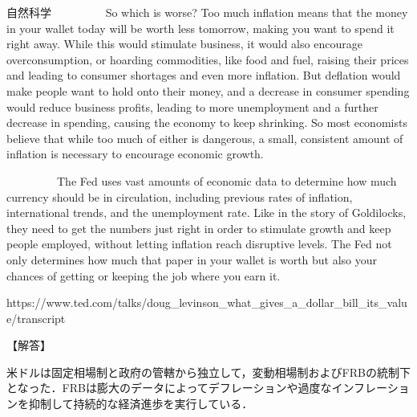 \documentclass[b4paper,fleqn,dvipdfmx]{jsarticle}
\begin{document}
\begin{itembox}[l]{自然科学}
\ \ \ \ \ \ \ \ \ So which is worse? Too much inflation means that the money in your wallet today will be worth less tomorrow, making you want to spend it right away. While this would stimulate business, it would also encourage overconsumption, or hoarding commodities, like food and fuel, raising their prices and leading to consumer shortages and even more inflation. But deflation would make people want to hold onto their money, and a decrease in consumer spending would reduce business profits, leading to more unemployment and a further decrease in spending, causing the economy to keep shrinking. So most economists believe that while too much of either is dangerous, a small, consistent amount of inflation is necessary to encourage economic growth. \par
\ \ \ \ \ \ \ \ \ The Fed uses vast amounts of economic data to determine how much currency should be in circulation, including previous rates of inflation, international trends, and the unemployment rate. Like in the story of Goldilocks, they need to get the numbers just right in order to stimulate growth and keep people employed, without letting inflation reach disruptive levels. The Fed not only determines how much that paper in your wallet is worth but also your chances of getting or keeping the job where you earn it. 

\begin{thebibliography}{99}
\begin{verbatim*}
https://www.ted.com/talks/doug_levinson_what_gives_a_dollar_bill_its_value/transcript
\end{verbatim*}
\end{thebibliography}

\end{itembox}


\begin{flushleft}
【解答】
\end{flushleft}

米ドルは固定相場制と政府の管轄から独立して，変動相場制およびFRBの統制下となった．FRBは膨大のデータによってデフレーションや過度なインフレーションを抑制して持続的な経済進歩を実行している．



\newpage
\end{document}
